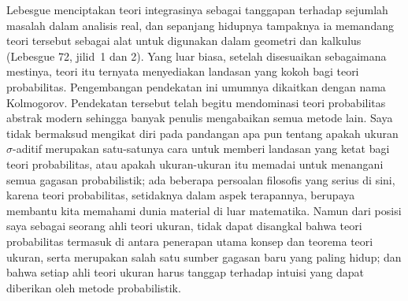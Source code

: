  
\loadeusm 
\def\hatcalBnu{\hat{\Cal B}_{\nu}} 
 
\def\chaptername{Teori probabilitas} 
\def\sectionname{Pendahuluan} 
 
 
Lebesgue menciptakan teori integrasinya sebagai tanggapan terhadap sejumlah
masalah dalam analisis real, dan sepanjang hidupnya tampaknya ia memandang
teori tersebut sebagai alat untuk digunakan dalam geometri dan kalkulus
({\smc Lebesgue 72}, jilid\ 1 dan 2). Yang luar biasa, setelah disesuaikan
sebagaimana mestinya, teori itu ternyata menyediakan landasan yang kokoh bagi
teori probabilitas. Pengembangan pendekatan ini umumnya dikaitkan dengan nama
Kolmogorov. Pendekatan tersebut telah begitu mendominasi teori probabilitas
abstrak modern sehingga banyak penulis mengabaikan semua metode lain. Saya
tidak bermaksud mengikat diri pada pandangan apa pun tentang apakah ukuran
$\sigma$-aditif merupakan satu-satunya cara untuk memberi landasan yang ketat
bagi teori probabilitas, atau apakah ukuran-ukuran itu memadai untuk menangani
semua gagasan probabilistik; ada beberapa persoalan filosofis yang serius di
sini, karena teori probabilitas, setidaknya dalam aspek terapannya, berupaya
membantu kita memahami dunia material di luar matematika. Namun dari posisi
saya sebagai seorang ahli teori ukuran, tidak dapat disangkal bahwa teori
probabilitas termasuk di antara penerapan utama konsep dan teorema teori
ukuran, serta merupakan salah satu sumber gagasan baru yang paling hidup; dan
bahwa setiap ahli teori ukuran harus tanggap terhadap intuisi yang dapat
diberikan oleh metode probabilistik. 
 
